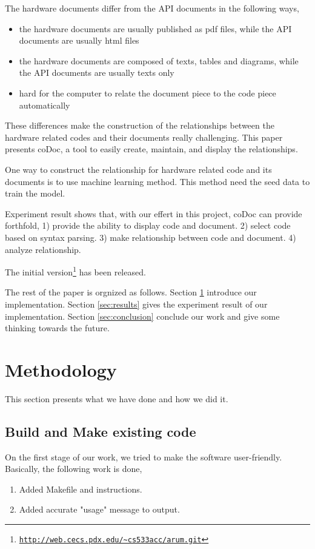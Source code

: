 \documentclass[11pt,letterpaper,oneside]{article}
\begin{document}
The hardware documents differ from the API documents in the following ways,
\begin{itemize}
\item the hardware documents are usually published as pdf files, while the API documents are usually html files
\item the hardware documents are composed of texts, tables and diagrams, while the API documents are usually texts only
\item hard for the computer to relate the document piece to the code piece automatically
\end{itemize}

These differences make the construction of the relationships between the hardware related codes and their documents really challenging.
This paper presents coDoc, a tool to easily create, maintain, and display the relationships.

One way to construct the relationship for hardware related code and its documents is to use machine learning method.
This method need the seed data to train the model.

Experiment result shows that, with our effert in this project, coDoc can provide forthfold, 
1) provide the ability to display code and document. 
2) select code based on syntax parsing.
3) make relationship between code and document.
4) analyze relationship.

The initial version\footnote{\texttt{\url{http://web.cecs.pdx.edu/~cs533acc/arum.git}}} has been released.

The rest of the paper is orgnized as follows. 
Section \ref{sec:methodology} introduce our implementation.
Section \ref{sec:results} gives the experiment result of our implementation. 
Section \ref{sec:conclusion} conclude our work and give some thinking towards the future.

\section{Methodology}
\label{sec:methodology}
This section presents what we have done and how we did it.

\subsection{Build and Make existing code}
On the first stage of our work, we tried to make the software user-friendly. Basically, the following work is done,
\begin{enumerate}
\item Added Makefile and instructions.
\item Added accurate "usage" message to output.
\end{enumerate}
\end{document}
